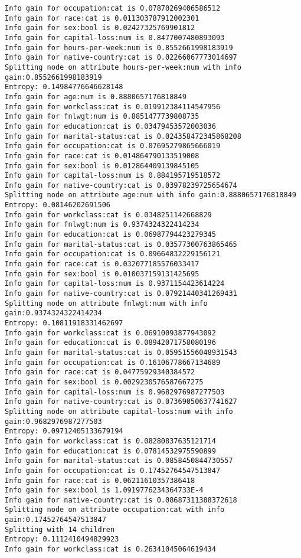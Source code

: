 \documentclass[a4paper,11pt,titlepage]{article}
\begin{document}
\begin{verbatim}
Info gain for occupation:cat is 0.07870269406586512
Info gain for race:cat is 0.011303787912002301
Info gain for sex:bool is 0.02427325769901812
Info gain for capital-loss:num is 0.8477007480893093
Info gain for hours-per-week:num is 0.8552661998183919
Info gain for native-country:cat is 0.02266067773014697
Splitting node on attribute hours-per-week:num with info gain:0.8552661998183919
Entropy: 0.14984776646628148
Info gain for age:num is 0.8880657176818849
Info gain for workclass:cat is 0.019912384114547956
Info gain for fnlwgt:num is 0.8851477739808735
Info gain for education:cat is 0.03479453572003036
Info gain for marital-status:cat is 0.024358472345868208
Info gain for occupation:cat is 0.07695279865666019
Info gain for race:cat is 0.014864790133519008
Info gain for sex:bool is 0.012864409139845105
Info gain for capital-loss:num is 0.884195719518572
Info gain for native-country:cat is 0.03978239725654674
Splitting node on attribute age:num with info gain:0.8880657176818849
Entropy: 0.08146202691506
Info gain for workclass:cat is 0.0348251142668829
Info gain for fnlwgt:num is 0.9374324322414234
Info gain for education:cat is 0.06987794423279345
Info gain for marital-status:cat is 0.03577300763865465
Info gain for occupation:cat is 0.09664832229156121
Info gain for race:cat is 0.032077185576033417
Info gain for sex:bool is 0.010037159131425695
Info gain for capital-loss:num is 0.9371154423614224
Info gain for native-country:cat is 0.07921440341269431
Splitting node on attribute fnlwgt:num with info gain:0.9374324322414234
Entropy: 0.10811918331462697
Info gain for workclass:cat is 0.06910093877943092
Info gain for education:cat is 0.08942071758080196
Info gain for marital-status:cat is 0.05951556048931543
Info gain for occupation:cat is 0.16106778667134689
Info gain for race:cat is 0.04775929340384572
Info gain for sex:bool is 0.0029230576587667275
Info gain for capital-loss:num is 0.9682976987277503
Info gain for native-country:cat is 0.07369050637741627
Splitting node on attribute capital-loss:num with info gain:0.9682976987277503
Entropy: 0.09712405133679194
Info gain for workclass:cat is 0.08280837635121714
Info gain for education:cat is 0.07814532975590899
Info gain for marital-status:cat is 0.0858450844730557
Info gain for occupation:cat is 0.17452764547513847
Info gain for race:cat is 0.06211610357386418
Info gain for sex:bool is 1.0919776234364733E-4
Info gain for native-country:cat is 0.08687311388372618
Splitting node on attribute occupation:cat with info gain:0.17452764547513847
Splitting with 14 children
Entropy: 0.1112410494829923
Info gain for workclass:cat is 0.26341045064619434

\end{verbatim}
\end{document}
